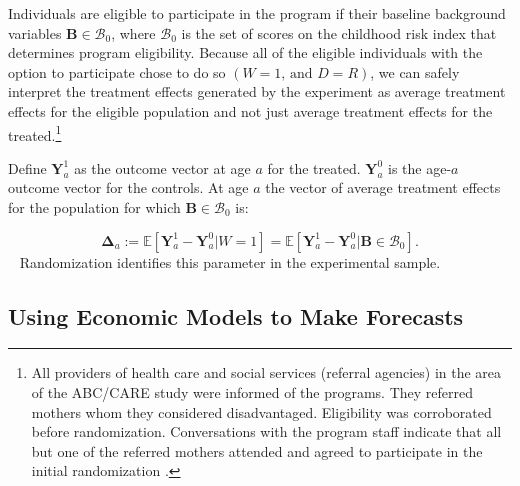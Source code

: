 Individuals are eligible to participate in the program if their baseline background variables $\bm{B}\in\mathcal{B}_0$, where $\mathcal{B}_0$ is the set of scores on the childhood risk index that determines program eligibility. Because all of the eligible individuals with the option to participate chose to do so $(W=1\text{, and } D=R)$, we can safely interpret the treatment effects generated by the experiment as average treatment effects for the eligible population and not just average treatment effects for the treated.\footnote{All providers of health care and social services (referral agencies) in the area of the ABC/CARE study were informed of the programs. They referred mothers whom they considered disadvantaged. Eligibility was corroborated before randomization. Conversations with the program staff indicate that all but one of the referred mothers attended and agreed to participate in the initial randomization \citep{Ramey-etal_2012-ABC}.}

Define $\bm{Y}^1_a$ as the outcome vector at age $a$ for the treated. $\bm{Y}^0_a$ is the age-$a$ outcome vector for the controls. At age $a$ the vector of average treatment effects for the population for which $\bm{B}\in\mathcal{B}_0$ is:

\begin{equation}
\bm{\Delta}_a  := \mathbb{E} \left[ \bm{Y}^1_a - \bm{Y}^0_a | W = 1 \right] = \mathbb{E} \left[\bm{Y}^1_a - \bm{Y}^0_{a} | \bm{B} \in \mathcal{B}_0 \right]. \label{eq:mainte}
\end{equation}\
%
Randomization identifies this parameter in the experimental sample.

\subsection{Using Economic Models to Make Forecasts}

